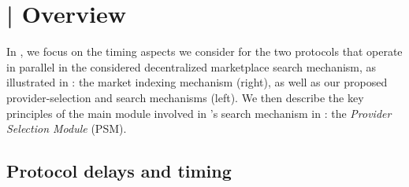 \section{\sysname\space | Overview}\label{sec:overview}

In , we focus on the timing aspects we consider for the two protocols that operate in parallel in the considered decentralized marketplace search mechanism, as illustrated in : 
the market indexing mechanism (right), as well as our proposed provider-selection and search mechanisms (left).
We then describe the key principles of the main module involved in \sysname's search mechanism in : the \emph{Provider Selection Module} (PSM).


\subsection{Protocol delays and timing}\label{subsec:search}

